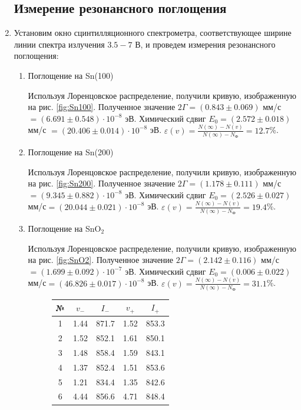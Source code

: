 \documentclass[a4paper, 12pt]{article}
\begin{document}
\begin{enumerate}
		\subsection{Измерение резонансного поглощения}
		\item Установим окно сцинтилляционного спектрометра, соответствующее ширине линии спектра излучения $3.5-7$ В, и проведем измерения резонансного поглощения:
		\begin{enumerate}
			\item Поглощение на Sn(100)\par
				Используя Лоренцовское распределение, получили кривую, изображенную на рис. \ref{fig:Sn100}. Полученное значение $2\Gamma=(0.843\pm 0.069)$ мм/с$=(6.691\pm 0.548)\cdot 10^{-8}$ эВ. Химический сдвиг $E_0=(2.572 \pm 0.018)$ мм/с $=(20.406\pm 0.014)\cdot 10^{-8}$ эВ. $\varepsilon(v)=\frac{N(\infty)-N(v)}{N(\infty)-N_{\text{Ф}}}=12.7$\%.
			\item Поглощение на Sn(200)\par
				Используя Лоренцовское распределение, получили кривую, изображенную на рис. \ref{fig:Sn200}. Полученное значение $2\Gamma=(1.178\pm 0.111)$ мм/с$=(9.345\pm 0.882)\cdot 10^{-8}$ эВ. Химический сдвиг $E_0=(2.526 \pm 0.027)$ мм/с$=(20.044\pm 0.021)\cdot 10^{-8}$ эВ. $\varepsilon(v)=\frac{N(\infty)-N(v)}{N(\infty)-N_{\text{Ф}}}=19.4$\%.
			\item Поглощение на SnO$_2$\par
				Используя Лоренцовское распределение, получили кривую, изображенную на рис. \ref{fig:SnO2}. Полученное значение $2\Gamma=(2.142\pm 0.116)$ мм/с$=(1.699 \pm 0.092)\cdot 10^{-7}$ эВ. Химический сдвиг $E_0=(0.006 \pm 0.022)$ мм/с$=(46.826\pm 0.017)\cdot 10^{-8}$ эВ. $\varepsilon(v)=\frac{N(\infty)-N(v)}{N(\infty)-N_{\text{Ф}}}=31.1$\%.
			\begin{figure}[h]
			\begin{minipage}{0.49\textwidth}
				\begin{tabular}{|c|c|c|c|c|}
					\hline
					№ & $v_-$ & $I_-$ & $v_+$ & $I_+$\\
					\hline
					1 & 1.44 & 871.7 & 1.52 & 853.3 \\
 					2 & 1.52 & 852.1 & 1.61 & 850.1 \\
				 	3 & 1.48 & 858.4 & 1.59 & 843.1 \\
 					4 & 1.37 & 852.4 & 1.51 & 853.6 \\
 					5 & 1.21 & 834.4 & 1.35 & 842.6 \\
 					6 & 4.44 & 856.6 & 4.71 & 848.4 \\

\end{tabular}
\end{minipage}
\end{figure}
\end{enumerate}
\end{enumerate}
\end{document}
